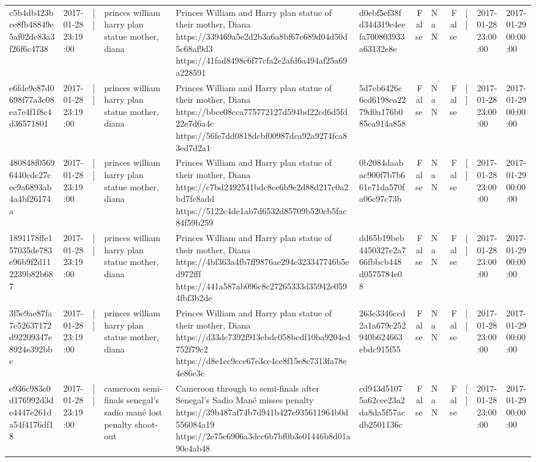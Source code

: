 \begin{tabular}{llllllrlrlll}
c5b4db423bce8fb48849e5af02dc83a3f26f6c4738 & 2017-01-28 23:19:00 & [] & princes william harry plan statue mother, diana & Princes William and Harry plan statue of their mother, Diana https://339469a5e2d2b3a6a8bf67e689d04d50d5c68af9d3 https://41fad8498c6f77cfa2e2afd6a494af25a69a228591 & d0ebf5ef38fd344319e4eefa700803933a63132e8e & False & NaN & False & [] & 2017-01-28 23:00:00 & 2017-01-29 00:00:00 \\
e6fde9e87d0698f77a3c08ea7e4f1f8c4d36571801 & 2017-01-28 23:19:00 & [] & princes william harry plan statue mother, diana & Princes William and Harry plan statue of their mother, Diana https://bbce08cca775772127d594bd22cd6d5fd22e7d6a4c https://56fe7dd0818dcbf00987dca92a9274fca83ed7d2a1 & 5d7eb6426c6cd6198ea2279d0a176b085ea914a858 & False & NaN & False & [] & 2017-01-28 23:00:00 & 2017-01-29 00:00:00 \\
480848f05696440cdc27cec9a6893ab4a4bf26174a & 2017-01-28 23:19:00 & [] & princes william harry plan statue mother, diana & Princes William and Harry plan statue of their mother, Diana https://c7bd2492541bdc8ce6b9e2d88d217c0a2bd7fc8add https://5122c4de1ab7d6532d85709b520cb5fac84f59b259 & 0b2084daabac900f7b7b661e71da570fa06c97c73b & False & NaN & False & [] & 2017-01-28 23:00:00 & 2017-01-29 00:00:00 \\
1891178ffe157035de783e96b9f2d112239b82b687 & 2017-01-28 23:19:00 & [] & princes william harry plan statue mother, diana & Princes William and Harry plan statue of their mother, Diana https://4bf363a4fb7ff9876ae294c323347746b5ed972fff https://441a587ab096c8c27265333d35942e0594fbf3b2de & dd65b19beb4450327e2a766fbbcb448d0575784e08 & False & NaN & False & [] & 2017-01-28 23:00:00 & 2017-01-29 00:00:00 \\
3f5e9ae87fa7e52637172d92209347e8924e392bbc & 2017-01-28 23:19:00 & [] & princes william harry plan statue mother, diana & Princes William and Harry plan statue of their mother, Diana https://d33dc7392f913ebdc058bcdf10ba9204ed752f79c2 https://d8e1cc9cce67e3cc4ce8f15e8c7313fa78e4e86e3c & 263e3346ccd2a1a679c252940b624663ebdc915f55 & False & NaN & False & [] & 2017-01-28 23:00:00 & 2017-01-29 00:00:00 \\
e936c983c0d176992d3de4447e261da54f4176df18 & 2017-01-28 23:19:00 & [] & cameroon semi-finals senegal's sadio mané lost penalty shoot-out & Cameroon through to semi-finals after Senegal’s Sadio Mané misses penalty https://39b487af74b7d941b427e935611964b0d556084a19 https://2e75e6906a3dcc6b7bf0b3e01446b8d01a90e4ab48 & cd943d51075a62cee23a2da8da5f57acdb2501136c & False & NaN & False & [] & 2017-01-28 23:00:00 & 2017-01-29 00:00:00 \\

\end{tabular}

